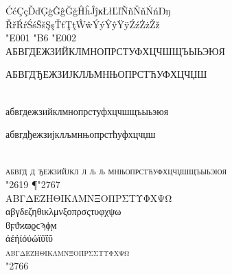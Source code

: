 \documentclass[pagesize,DIV14]{scrartcl}
\begin{document}
\begin{center}
{{ĆćÇçĎďĢģĜĝĞğĤĥĴĵĸŁłĽľÑñŇňŃńŊŋ\\
ŘřŔŕŚśŠšŞşŤťŢţŴŵÝýŶŷŸÿŹźŻżŽž}\\
{\Huge \char"E001 \char"B6 \char"E002}\\
АБВГДЕЖЗИЙКЛМНОПРСТУФХЦЧШЩЪЫЬЭЮЯ\\
\begin{serbian}	{%
	АБВГДЂЕЖЗИЈКЛЉМНЊОПРСТЋУФХЦЧЏШ}
\end{serbian}\\
абвгдежзийклмнопрстуфхцчшщъыьэюя\\
\begin{serbian}
	{%
	абвгдђежзијклљмнњопрстћуфхцчџш}
\end{serbian}\\
\textsc{абвгд%
	{д}%
	ђежзийјкл%
	{л}%
	љ%
	{љ}%
	мнњопрстћуфхцчџшщъыьэюя}\\
{\Huge \char"2619 {¶}\char"2767}\\
ΑΒΓΔΕΖΗΘΙΚΛΜΝΞΟΠΡΣΤΥΦΧΨΩ\\
αβγδεζηθικλμνξοπρσςτυφχψω\\
ϐϝϑϰϖϱϲϡϕϻ\\
άέήίόύώϊϋΐΰ\\
\textsc{αβγδεζηθικλμνξοπρσςτυφχψω}\\
{\Huge \char"2766}\\
}
\end{center}
\clearpage
\fontsize{16}{16}\itshape
\end{document}
